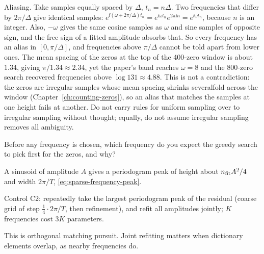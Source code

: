 \begin{pitfall}
Aliasing. Take samples equally spaced by $\Delta$, $t_n=n\Delta$. Two frequencies that differ by $2\pi/\Delta$ give identical samples: $e^{\ii(\omega+2\pi/\Delta)t_n}=e^{\ii\omega t_n}e^{2\pi\ii n}=e^{\ii\omega t_n}$, because $n$ is an integer. Also, $-\omega$ gives the same cosine samples as $\omega$ and sine samples of opposite sign, and the free sign of a fitted amplitude absorbs that. So every frequency has an alias in $[0,\pi/\Delta]$, and frequencies above $\pi/\Delta$ cannot be told apart from lower ones. The mean spacing of the zeros at the top of the 400-zero window is about $1.34$, giving $\pi/1.34\approx2.34$, yet the paper's band reaches $\omega=8$ and the 800-zero search recovered frequencies above $\log131\approx4.88$. This is not a contradiction: the zeros are irregular samples whose mean spacing shrinks severalfold across the window (Chapter~\ref{ch:counting-zeros}), so an alias that matches the samples at one height fails at another. Do not carry rules for uniform sampling over to irregular sampling without thought; equally, do not assume irregular sampling removes all ambiguity.
\end{pitfall}

\begin{checkpoint}
Before any frequency is chosen, which frequency do you expect the greedy search to pick first for the zeros, and why?
\end{checkpoint}

\begin{keyideas}
\item A sinusoid of amplitude $A$ gives a periodogram peak of height about $n_{\rm fit}A^2/4$ and width $2\pi/T$, \eqref{eq:sparse-frequency-peak}.
\item Control C2: repeatedly take the largest periodogram peak of the residual (coarse grid of step $\tfrac14\cdot2\pi/T$, then refinement), and refit all amplitudes jointly; $K$ frequencies cost $3K$ parameters.
\item This is orthogonal matching pursuit. Joint refitting matters when dictionary elements overlap, as nearby frequencies do.
\end{keyideas}

